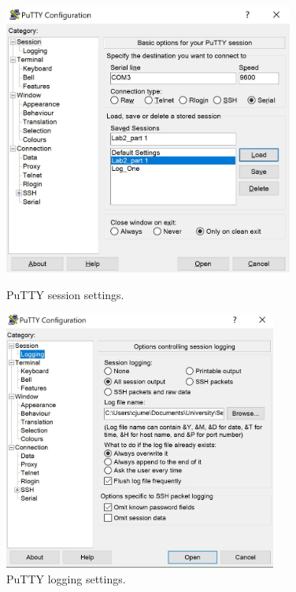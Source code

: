 \documentclass[11pt]{article}
\begin{document}
\begin{figure}[!ht]
    \centering
    \begin{minipage}{0.45\textwidth}
        \centering
        \includegraphics[width=0.85\textwidth]{pics/Putty_shot_1.JPG}
        \caption{PuTTY session settings.}
        \label{fig:puttys1}
    \end{minipage}\hfill
    \begin{minipage}{0.5\textwidth}
        \centering
        \includegraphics[width=0.8\textwidth]{pics/Putty_shot_2.JPG}
        \caption{PuTTY logging settings.}
        \label{fig:puttys2}
    \end{minipage}
\end{figure}
\end{document}

